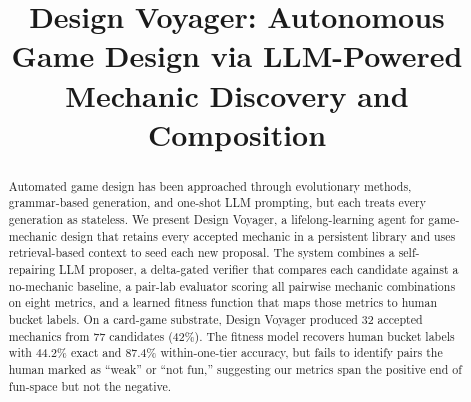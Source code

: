 \documentclass[conference]{IEEEtran}
\begin{document}
\title{Design Voyager: Autonomous Game Design via
LLM-Powered Mechanic Discovery and Composition}

\author{
\and
{}
\and
{}
}

\maketitle

\begin{abstract}
Automated game design has been approached through evolutionary methods, grammar-based generation, and one-shot LLM prompting, but each treats every generation as stateless. We present Design Voyager, a lifelong-learning agent for game-mechanic design that retains every accepted mechanic in a persistent library and uses retrieval-based context to seed each new proposal. The system combines a self-repairing LLM proposer, a delta-gated verifier that compares each candidate against a no-mechanic baseline, a pair-lab evaluator scoring all pairwise mechanic combinations on eight metrics, and a learned fitness function that maps those metrics to human bucket labels. On a card-game substrate, Design Voyager produced 32 accepted mechanics from 77 candidates (42\%). The fitness model recovers human bucket labels with 44.2\% exact and 87.4\% within-one-tier accuracy, but fails to identify pairs the human marked as ``weak'' or ``not fun,'' suggesting our metrics span the positive end of fun-space but not the negative.
\end{abstract}
\end{document}
